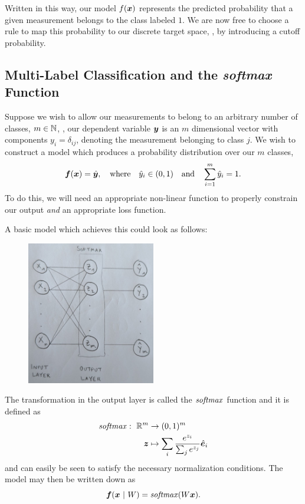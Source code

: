 Written in this way, our model $f(\bm{x})$ represents the predicted probability that a given measurement belongs to the class labeled $1$.
We are now free to choose a rule to map this probability to our discrete target space, \eg, by introducing a cutoff probability. 

%
%
\subsection{Multi-Label Classification and the \textit{softmax} Function}
%
%
Suppose we wish to allow our measurements to belong to an arbitrary number of classes, $m \in \mathbb{N}$, \ie, our dependent variable $\bm{y}$ is an $m$ dimensional vector with components $y_i = \delta_{ij}$, denoting the measurement belonging to class $j$.
We wish to construct a model which produces a probability distribution over our $m$ classes,
%
\begin{equation}
    \bm{f}(\bm{x}) = \hat{\bm{y}}, \quad \text{where}\quad \hat{y}_i \in (0, 1)\quad \text{and}\quad \sum_{i=1}^m \hat{y}_i = 1.
\end{equation}
%
To do this, we will need an appropriate non-linear function to properly constrain our output \textit{and} an appropriate loss function.

A basic model which achieves this could look as follows:
%
\begin{figure}[H]
    \centering
    \includegraphics[width=0.5\textwidth]{../figures/chapter_01/nn_diagram_multilabel_classifier.png}
\end{figure}
%
\noindent The transformation in the output layer is called the $\operatorname*{\text{\textit{softmax}}}$ function and it is defined as
%
\begin{align}
    \operatorname*{\text{\textit{softmax}}}: ~\mathbb{R}^m &\rightarrow (0, 1)^m \nonumber\\
              ~\bm{z}   &\mapsto \sum_i \frac{e^{z_i}}{\sum_j e^{z_j}} \hat{\bm{e}}_i
\end{align}
%
and can easily be seen to satisfy the necessary normalization conditions.
The model may then be written down as
%
\begin{equation}
    \bm{f}(\bm{x} ~|~ W) = \operatorname*{\text{\textit{softmax}}}(W \bm{x}).
\end{equation}
%

